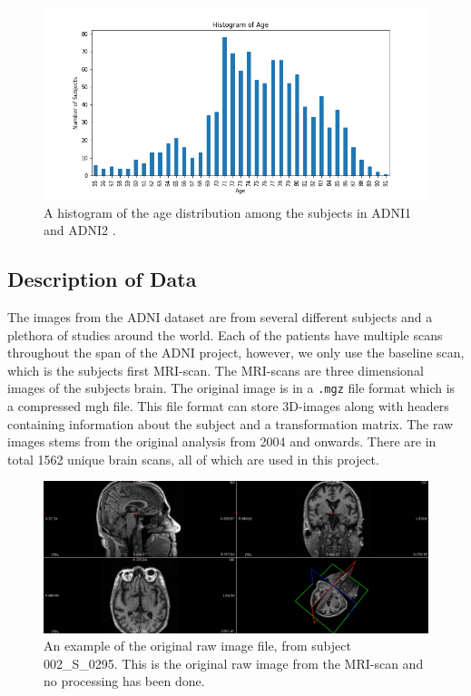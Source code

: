 \documentclass[12pt, fleqn, titlepage]{article}
\newcommand{\1}[1]{\mathds{1}\left[#1\right]}
\begin{document}
\begin{figure}[H]
	\centering
	\includegraphics[width=0.9\linewidth]{imgs/age_distro}
	\caption{A histogram of the age distribution among the subjects in ADNI1 and ADNI2 \cite{adni,adni1}.}
	\label{fig:age}
\end{figure}


\subsection{Description of Data} \label{dataDescription}


The images from the ADNI dataset are from several different subjects and a plethora of studies around the world.
Each of the patients have multiple scans throughout the span of the ADNI project, however, we only use the baseline scan, which is the subjects first MRI-scan. 
The MRI-scans are three dimensional images of the subjects brain. 
The original image is in a \texttt{.mgz} file format which is a compressed mgh file. 
This file format can store 3D-images along with headers containing information about the subject and a transformation matrix.
The raw images stems from the original analysis from 2004 and onwards. There are in total 1562 %
unique brain scans, all of which are used in this project.

\begin{figure}[H]
	\centering
	\includegraphics[width=0.95\linewidth]{mymans2}
	\caption{An example of the original raw image file, from subject 002\_S\_0295. This is the original raw image from the MRI-scan and no processing has been done.}
	\label{fig:screenshot001}
\end{figure}
\end{document}
